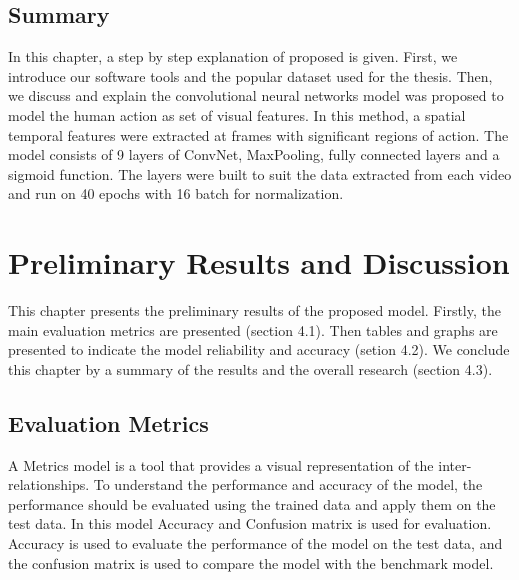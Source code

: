 \subsection{Summary}
\hspace{5mm} In this chapter, a step by step explanation of proposed is given. First, we introduce our software tools and the popular dataset used for the thesis. Then, we discuss and explain the convolutional neural networks model was proposed to model the human action as set of visual features. In this method, a spatial temporal features were extracted at frames with significant regions of action. The model consists of 9 layers of ConvNet, MaxPooling, fully connected layers and a sigmoid function. The layers were built to suit the data extracted from each video and run on 40 epochs with 16 batch for normalization.
\section{Preliminary Results and Discussion}
This chapter presents the preliminary results of the proposed model. Firstly, the main evaluation metrics are presented (section 4.1). Then tables and graphs are presented to indicate the model reliability and accuracy (setion 4.2). We conclude this chapter by a summary of the results and the overall research (section 4.3).

\subsection{Evaluation Metrics}
\hspace{5mm} A Metrics model is a tool that provides a visual representation of the inter-relationships. To understand the performance and accuracy of the model, the performance should be evaluated using the trained data and apply them on the test data. In this model Accuracy and Confusion matrix is used for evaluation. Accuracy is used to evaluate the performance of the model on the test data, and the confusion matrix is used to compare the model with the benchmark model.
